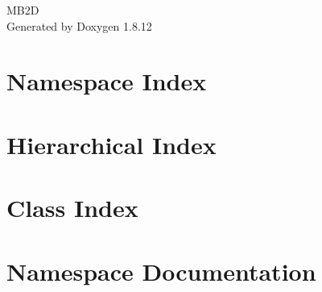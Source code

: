 \documentclass[twoside]{article}
\newcommand{\+}{\discretionary{\mbox{\scriptsize$\hookleftarrow$}}{}{}}
\begin{document}
\hypersetup{pageanchor=false,
             bookmarksnumbered=true,
             pdfencoding=unicode
            }
\begin{titlepage}
\vspace*{7cm}
\begin{center}%
{\Large M\+B2D }\\
\vspace*{1cm}
{\large Generated by Doxygen 1.8.12}\\
\end{center}
\end{titlepage}
\tableofcontents
{}
\hypersetup{pageanchor=true}

\section{Namespace Index}

\section{Hierarchical Index}

\section{Class Index}

\section{Namespace Documentation}









\end{document}
